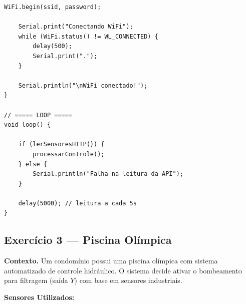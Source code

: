 \documentclass[12pt]{article}
\begin{document}
\begin{lstlisting}[caption={Sistema de controle de irrigação com ESP32 e sensores via API REST.}, label={lst:irrigacao_esp32}]
    WiFi.begin(ssid, password);

    Serial.print("Conectando WiFi");
    while (WiFi.status() != WL_CONNECTED) {
        delay(500);
        Serial.print(".");
    }

    Serial.println("\nWiFi conectado!");
}

// ===== LOOP =====
void loop() {

    if (lerSensoresHTTP()) {
        processarControle();
    } else {
        Serial.println("Falha na leitura da API");
    }

    delay(5000); // leitura a cada 5s
}
\end{lstlisting}

\newpage
\subsection*{Exercício 3 — Piscina Olímpica}

\textbf{Contexto.}
Um condomínio possui uma piscina olímpica com sistema automatizado de controle
hidráulico. O sistema decide ativar o bombeamento para filtragem (saída $Y$)
com base em sensores industriais.

\textbf{Sensores Utilizados:}
\end{document}
